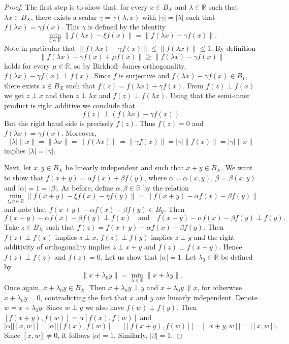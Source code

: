 \documentclass{memo-l}
\theoremstyle{definition}
\theoremstyle{remark}
\numberwithin{section}{chapter}
\numberwithin{equation}{chapter}
\newcommand\R{\ensuremath{\mathbb{R}}}
\begin{document}
\begin{proof}
    The first step is to show that, for every $x \in B_X$ and $\lambda
    \in \R$ such that $\lambda x \in B_X$, there exists a scalar
    $\gamma =\gamma (\lambda ,x)$ with $|\gamma |=|\lambda |$ such
    that $f(\lambda x)=\gamma f(x)$. This $\gamma $ is defined by the
    identity
    \[
    \min_{\xi \in \R}\|f(\lambda x)-\xi f(x)\|=\|f(\lambda x)-\gamma
    f(x)\|.
    \]
    Note in particular that $\|f(\lambda x)-\gamma f(x)\|\le
    \|f(\lambda x)\|\le 1$. By definition
    \[
    \|f(\lambda x)-\gamma f(x)+\mu f(x)\|\ge \|f(\lambda x)-\gamma
    f(x)\|
    \]
    holds for every $\mu \in \R$, so by Birkhoff--James orthogonality, $f(\lambda x)-\gamma f(x) \perp f(x)$. Since $f$ is
    surjective and $f(\lambda x)-\gamma f(x) \in B_Y$, there exists $z
    \in B_X$ such that $f(z)=f(\lambda
    x)-\gamma f(x)$. From $f(z)\perp f(x)$ we get $z\perp x$ and then
    $z\perp \lambda x$ and $f(z)\perp f(\lambda x)$. Using that
    the semi-inner product is right additive we conclude that
    \[
    f(z)\perp (f(\lambda x)-\gamma f(x)).
    \]
    But the right hand side is precisely $f(z)$.
    Thus $f(z)=0$ and $f(\lambda x)=\gamma f(x)$. Moreover,
    \[
    |\lambda | \|x\|=\|\lambda x\|= \|f(\lambda x)\|=\|\gamma
    f(x)\|=|\gamma | \|f(x)\|= |\gamma | \|x\|
    \]
    implies $|\lambda |= |\gamma |$.

    Next, let $x,y \in B_X$ be linearly independent and such that $x+y
    \in B_X$. We want to show
    that $f(x+y)=\alpha f(x)+\beta f(y)$, where $\alpha =\alpha
    (x,y)$, $\beta =\beta (x,y)$ and $|\alpha |=1=|\beta |$. As
    before, define $\alpha ,\beta \in \R$ by the relation
    \[
    \min_{\xi ,\eta \in \R} \|f(x+y)-\xi f(x)-\eta
    f(y)\|=\|f(x+y)-\alpha f(x)-\beta f(y)\|
    \]
    and note that $f(x+y)-\alpha f(x)-\beta f(y) \in B_Y$.
    Then
    \[
    f(x+y)-\alpha f(x)-\beta f(y)\perp f(x)\quad\text{and}\quad
    f(x+y)-\alpha f(x)-\beta f(y)\perp f(y).
    \]
    Take $z \in B_X$ such that $f(z)=f(x+y)-\alpha f(x)-\beta f(y)$.
    Then $f(z)\perp f(x)$ implies $z\perp x$, $f(z)\perp f(y)$ implies
    $z\perp y$ and the right additivity of orthogonality implies
    $z\perp x+y$ and $f(z)\perp f(x+y)$. Hence $f(z)\perp f(z)$ and
    $f(z)=0$. Let us show that $|\alpha |= 1$. Let $\lambda _0\in
    \R$ be defined by
    \[
    \|x+\lambda _0y\|=\min_{\lambda \in \R} \|x+\lambda y\|.
    \]
    Once again, $x+\lambda _0y \in B_X$.
    Then $x+\lambda _0y \perp y$ and $x+\lambda _0y\not\perp x$, for
    otherwise $x+\lambda _0y=0$, contradicting the fact that $x$ and
    $y$ are linearly independent. Denote $w=x+\lambda _0y$. Since
    $w\perp y$ we also have $f(w)\perp f(y)$. Then
    $[f(x+y),f(w)]=\alpha [f(x),f(w)]$ and
    \[
        |\alpha | |[x,w]|= |\alpha |
        |[f(x),f(w)]|=|[f(x+y),f(w)]|= |[x+y,w]|=|[x,w]|.
    \]
    Since $[x,w]\neq 0$, it follows $|\alpha |= 1$. Similarly,
    $|\beta |= 1$.


\end{proof}
\end{document}

